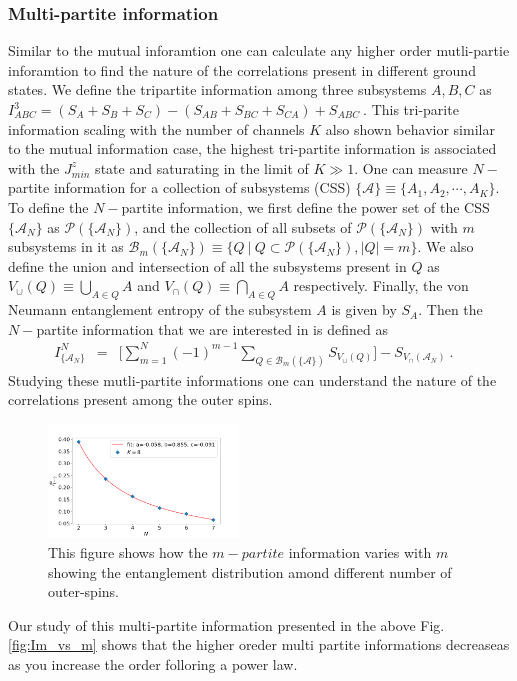 \documentclass[reprint,prb,superscriptaddress]{revtex4-2}
\begin{document}
\subsubsection{Multi-partite information}
\noindent Similar to the mutual inforamtion one can calculate any higher order mutli-partie inforamtion to find the nature of the correlations present in different ground states. We define the tripartite information among three subsystems $A,B,C$ as $I^3_{ABC} = (S_A+S_B+S_C)-(S_{AB}+S_{BC}+S_{CA})+S_{ABC}~$. This tri-parite information scaling with the number of channels $K$ also shown behavior similar to the mutual information case, the highest tri-partite information is associated with the $J^z_{min}$ state and saturating in the limit of $K\gg 1$. One can measure $N-$partite information for a collection of subsystems (CSS) $\{\mathcal{A}\}\equiv\{A_1,A_2,\cdots,A_K\}$. To define the $N-$partite information, we first define the power set of the CSS $\{\mathcal{A}_N\}$ as $\mathcal{P}(\{\mathcal{A}_{N}\})$, and the collection of all subsets of $\mathcal{P}(\{\mathcal{A}_{N}\})$ with $m$ subsystems in it as $\mathcal{B}_m(\{\mathcal{A}_N\})\equiv \{ Q~| ~Q\subset \mathcal{P}(\{\mathcal{A}_{N}\}), |Q|=m \}$. We also define the union and intersection of all the subsystems present in $Q$ as ${V}_{\cup}({Q})\equiv \bigcup_{A\in Q} A$ and ${V}_{\cap}({Q})\equiv \bigcap_{A\in Q} A$ respectively. Finally, the von Neumann entanglement entropy of the subsystem $A$ is given by $S_{A} $. Then the $N-$partite information that we are interested in is defined as
\begin{eqnarray}
I^{N}_{\{\mathcal{A}_N\}} &=& \bigg[\displaystyle\sum_{m=1}^{N} (-1)^{m-1} \displaystyle\sum_{Q \in \mathcal{B}_m(\{\mathcal{A}\})} S_{V_{\cup}({Q})} \bigg]- S_{V_{\cap}(\mathcal{A}_N)}~.~~~~
\label{eq:I_N_definition}
\end{eqnarray}
Studying these mutli-partite informations one can understand the nature of the correlations present among the outer spins.
\begin{figure}
\includegraphics[width=0.45\textwidth]{plt/IN_vs_N_K8.png}
\caption{This figure shows how the $m-partite$ information varies with $m$ showing the entanglement distribution amond different number of outer-spins.}
\label{fig:Im_vs_m}
\end{figure}
\noindent Our study of this multi-partite information presented in the above Fig.\eqref{fig:Im_vs_m} shows that the higher oreder multi partite informations decreaseas as you increase the order folloring a power law.
\end{document}
